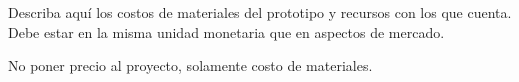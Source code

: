\justifying

Describa aquí los costos de materiales del prototipo y recursos con los que cuenta.
Debe estar en la misma unidad monetaria que en aspectos de mercado.

No poner precio al proyecto, solamente costo de materiales.